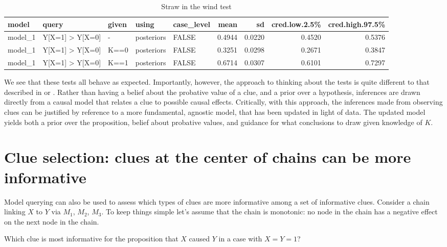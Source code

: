 \documentclass[
  12pt,
]{book}
\begin{document}
\begin{table}

\caption{\label{tab:unnamed-chunk-92}Straw in the wind test}
\centering
\begin{tabular}[t]{l|l|l|l|l|r|r|r|r}
\hline
model & query & given & using & case\_level & mean & sd & cred.low.2.5\% & cred.high.97.5\%\\
\hline
model\_1 & Y[X=1] > Y[X=0] & - & posteriors & FALSE & 0.4944 & 0.0220 & 0.4520 & 0.5376\\
\hline
model\_1 & Y[X=1] > Y[X=0] & K==0 & posteriors & FALSE & 0.3251 & 0.0298 & 0.2671 & 0.3847\\
\hline
model\_1 & Y[X=1] > Y[X=0] & K==1 & posteriors & FALSE & 0.6714 & 0.0307 & 0.6101 & 0.7297\\
\hline
\end{tabular}
\end{table}

We see that these tests all behave as expected. Importantly, however, the approach to thinking about the tests is quite different to that described in \citet{collier2011understanding} or \citet{humphreys2015mixing}. Rather than having a belief about the probative value of a clue, and a prior over a hypothesis, inferences are drawn directly from a causal model that relates a clue to possible causal effects. Critically, with this approach, the inferences made from observing clues can be justified by reference to a more fundamental, agnostic model, that has been updated in light of data. The updated model yields both a prior over the proposition, belief about probative values, and guidance for what conclusions to draw given knowledge of \(K\).

\hypertarget{clue-selection-clues-at-the-center-of-chains-can-be-more-informative}{%
\section{Clue selection: clues at the center of chains can be more informative}\label{clue-selection-clues-at-the-center-of-chains-can-be-more-informative}}

Model querying can also be used to assess which types of clues are more informative among a set of informative clues. Consider a chain linking \(X\) to \(Y\) via \(M_1\), \(M_2\), \(M_3\). To keep things simple let's assume that the chain is monotonic: no node in the chain has a negative effect on the next node in the chain.

Which clue is most informative for the proposition that \(X\) caused \(Y\) in a case with \(X=Y=1\)?
\end{document}
